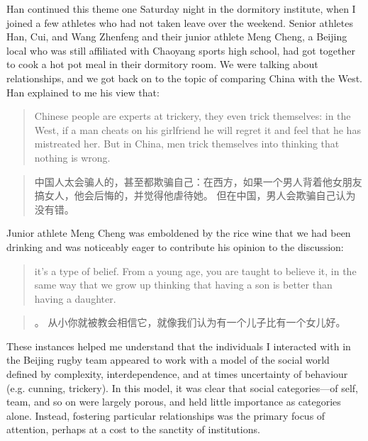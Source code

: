\begin{CJK}{UTF8}{gbsn}
Han continued this theme one Saturday night in the dormitory institute, when I joined a few athletes who had not taken leave over the weekend. Senior athletes Han, Cui, and Wang Zhenfeng and their junior athlete Meng Cheng, a Beijing local who was still affiliated with Chaoyang sports high school, had got together to cook a hot pot meal in their dormitory room.  We were talking about relationships, and we got back on to the topic of comparing China with the West.  Han explained to me his view that:

\begin{quotation}
  Chinese people are experts at trickery, they even trick themselves: in the West, if a man cheats on his girlfriend he will regret it and feel that he has mistreated her.  But in China, men trick themselves into thinking that nothing is wrong.
\end{quotation}

\begin{quotation}
  中国人太会骗人的，甚至都欺骗自己：在西方，如果一个男人背着他女朋友搞女人，他会后悔的，并觉得他虐待她。 但在中国，男人会欺骗自己认为没有错。
\end{quotation}

Junior athlete Meng Cheng was emboldened by the rice wine that we had been drinking and was noticeably eager to contribute his opinion to the discussion:

  \begin{quotation}
    \textellipsis it's a type of belief. From a young age, you are taught to believe it, in the same way that we grow up thinking that having a son is better than having a daughter.
  \end{quotation}

  \begin{quotation}
    。 从小你就被教会相信它，就像我们认为有一个儿子比有一个女儿好。
  \end{quotation}

These instances helped me understand that the individuals I interacted with in the Beijing rugby team appeared to work with a model of the social world defined by complexity, interdependence, and at times uncertainty of behaviour (e.g. cunning, trickery).  In this model, it was clear that social categories---of self, team, and so on were largely porous, and held little importance as categories alone.  Instead, fostering particular relationships was the primary focus of attention, perhaps at a cost to the sanctity of institutions.




\end{CJK}
